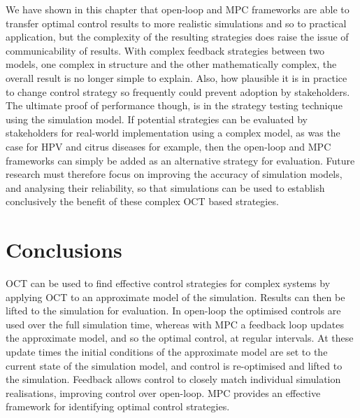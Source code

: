 We have shown in this chapter that open-loop and MPC frameworks are able to transfer optimal control results to more realistic simulations and so to practical application, but the complexity of the resulting strategies does raise the issue of communicability of results. With complex feedback strategies between two models, one complex in structure and the other mathematically complex, the overall result is no longer simple to explain. Also, how plausible it is in practice to change control strategy so frequently could prevent adoption by stakeholders. The ultimate proof of performance though, is in the strategy testing technique using the simulation model. If potential strategies can be evaluated by stakeholders for real-world implementation using a complex model, as was the case for HPV \citep{choi_transmission_2010} and citrus diseases \citep{cunniffe_optimising_2015} for example, then the open-loop and MPC frameworks can simply be added as an alternative strategy for evaluation. Future research must therefore focus on improving the accuracy of simulation models, and analysing their reliability, so that simulations can be used to establish conclusively the benefit of these complex OCT based strategies.

\section{Conclusions}

OCT can be used to find effective control strategies for complex systems by applying OCT to an approximate model of the simulation. Results can then be lifted to the simulation for evaluation. In open-loop the optimised controls are used over the full simulation time, whereas with MPC a feedback loop updates the approximate model, and so the optimal control, at regular intervals. At these update times the initial conditions of the approximate model are set to the current state of the simulation model, and control is re-optimised and lifted to the simulation. Feedback allows control to closely match individual simulation realisations, improving control over open-loop. MPC provides an effective framework for identifying optimal control strategies.
